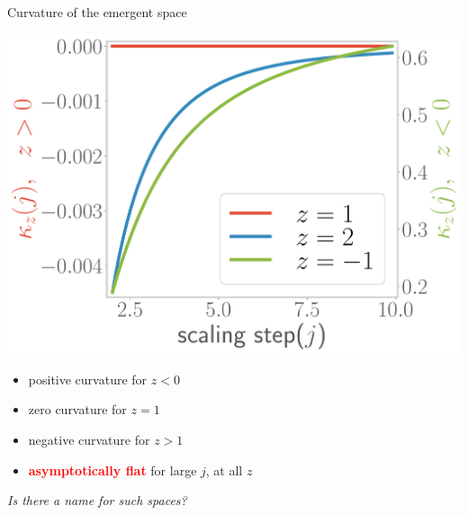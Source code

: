 \documentclass[11pt,aspectratio=169]{beamer}
\newcommand{\focus}[1]{\textcolor{red}{\bf{#1}}}
\begin{document}
\begin{frame}{Curvature of the emergent space}
\begin{minipage}{0.45\textwidth}
	\includegraphics[width=\textwidth]{figures/curvature-pos.pdf}
\end{minipage}
\begin{minipage}{0.5\textwidth}
	\begin{itemize}
		\item positive curvature for \(z < 0\)\\[10pt]
		\item zero curvature for \(z = 1\)\\[10pt]
		\item negative curvature for \(z  > 1\)\\[10pt]
		\item \focus{asymptotically flat} for large \(j\), at all \(z\)
	\end{itemize}
\end{minipage}

\vspace*{\fill}
{\it Is there a name for such spaces?}
\end{frame}
\end{document}
